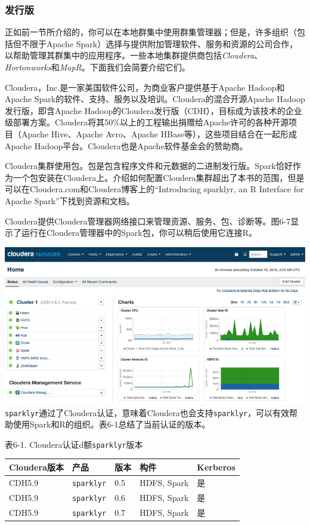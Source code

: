 \documentclass[
]{article}
\begin{document}
\hypertarget{ux53d1ux884cux7248}{%
\subsubsection{发行版}\label{ux53d1ux884cux7248}}

正如前一节所介绍的，你可以在本地群集中使用群集管理器；但是，许多组织（包括但不限于Apache
Spark）选择与提供附加管理软件、服务和资源的公司合作，以帮助管理其群集中的应用程序。一些本地集群提供商包括\emph{Cloudera}、\emph{Hortonworks}和\emph{MapR}。下面我们会简要介绍它们。

Cloudera，Inc.是一家美国软件公司，为商业客户提供基于Apache
Hadoop和Apache Spark的软件、支持、服务以及培训。Cloudera的混合开源Apache
Hadoop发行版，即含Apache
Hadoop的Cloudera发行版（CDH），目标成为该技术的企业级部署方案。Cloudera将其50\%以上的工程输出捐赠给Apache许可的各种开源项目（Apache
Hive、Apache Avro、Apache HBase等），这些项目结合在一起形成Apache
Hadoop平台。Cloudera也是Apache软件基金会的赞助商。

Cloudera集群使用包。包是包含程序文件和元数据的二进制发行版。Spark恰好作为一个包安装在Cloudera上。介绍如何配置Cloudera集群超出了本书的范围，但是可以在Cloudera.com和Cloudera博客上的``Introducing
sparklyr, an R Interface for Apache Spark''下找到资源和文档。

Cloudera提供Cloudera管理器网络接口来管理资源、服务、包、诊断等。图6-7显示了运行在Cloudera管理器中的Spark包，你可以稍后使用它连接R。

\includegraphics{figures/6_7.png}
\texttt{sparklyr}通过了Cloudera认证，意味着Cloudera也会支持\texttt{sparklyr}，可以有效帮助使用Spark和R的组织。表6-1总结了当前认证的版本。

表6-1. Cloudera认证d额\texttt{sparklyr}版本

\begin{longtable}[]{@{}lllll@{}}
\toprule
Cloudera版本 & 产品 & 版本 & 构件 & Kerberos\tabularnewline
\midrule
\endhead
CDH5.9 & \texttt{sparklyr} & 0.5 & HDFS, Spark & 是\tabularnewline
CDH5.9 & \texttt{sparklyr} & 0.6 & HDFS, Spark & 是\tabularnewline
CDH5.9 & \texttt{sparklyr} & 0.7 & HDFS, Spark & 是\tabularnewline
\bottomrule
\end{longtable}
\end{document}
